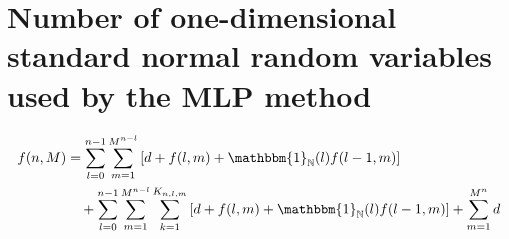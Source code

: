 \documentclass[a4paper,12pt]{article}
\providecommand{\1}{\mathbbm{1}}
\providecommand{\N}{\mathbb{N}}
\newcommand{\Zz}{Z}
\DeclarePairedDelimiter{\pr}()
\DeclarePairedDelimiter{\br}[]
\newcommand{\bpr}[1]{\pr[\big]{#1}}
\newcommand{\bbpr}[1]{\pr[\Big]{#1}}
\newcommand{\bbbbr}[1]{\br[\bigg]{#1}}
\newcommand{\bbbbbr}[1]{\br[\Bigg]{#1}}
\newcommand{\dindex}{\mathfrak{i}}
\begin{document}
\section{Number of one-dimensional standard normal random variables used by the MLP method}
\begin{equation}
	\begin{split}
    f(n,M) &= \sum_{l=0}^{n-1}
		\sum_{m=1}^{M^{n-l}}\left[
    d %
    + f(l,m)
    + \mathbbm{1}_\N(l) f(l-1,m)\right] \\
    &\quad +
    \sum_{l=0}^{n-1}
		\sum_{m=1}^{M^{n-l}} 
		\sum_{k=1}^{K_{n,l,m}}\left[
		d
    + f(l,m)
    + \mathbbm{1}_\N(l) f(l-1,m)\right] +
    \sum_{m=1}^{M^n} d
	\end{split}
\end{equation}
\end{document}
